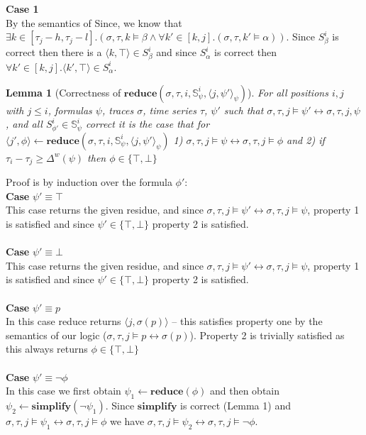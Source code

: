 \documentclass[10pt,a4paper]{article}
\newcommand{\rp}[2]{\ensuremath{\langle #1, #2 \rangle}}
\newcommand{\rpt}[3]{\ensuremath{\langle #1, #2 \rangle}_{#3}}
\newtheorem{lemma}{Lemma}
\begin{document}
\noindent \textbf{Case 1} \\

By the semantics of Since, we know that $\exists k \in [\tau_j-h,\tau_j-l].(\sigma, \tau, k \vDash \beta \wedge \forall k' \in [k,j].(\sigma, \tau, k' \vDash \alpha))$. Since $S^i_{\beta}$ is correct then there is a $\rp{k}{\top} \in S^i_{\beta}$ and since $S^i_\alpha$ is correct then $\forall k' \in [k,j]. \rp{k'}{\top} \in S^i_\alpha$.

\begin{lemma}[Correctness of $\mathbf{reduce}(\sigma, \tau, i, \mathbb{S}^i_{\psi}, \rpt{j}{\psi'}{\psi})$]
For all positions $i,j$ with $j \leq i$, formulas $\psi$, traces $\sigma$, time series $\tau$, $\psi'$ such that 
$\sigma, \tau, j \vDash \psi' \leftrightarrow \sigma, \tau, j, \psi$, and all $S^i_{\phi'} \in \mathbb{S}^i_{\psi}$ correct it is the case that
for $\rp{j'}{\phi} \leftarrow \mathbf{reduce}(\sigma, \tau, i, \mathbb{S}^i_{\psi}, \rpt{j}{\psi'}{\psi})$ 
1) $\sigma, \tau, j \vDash \psi \leftrightarrow \sigma, \tau, j \vDash \phi$ and
2) if $\tau_i - \tau_j \geq \Delta^w(\psi)$ then $\phi \in \{\top, \bot\}$
\end{lemma}

\noindent Proof is by induction over the formula $\phi'$: \\
\noindent \textbf{Case} $\psi' \equiv \top$ \\
This case returns the given residue, and since $\sigma, \tau, j \vDash \psi' \leftrightarrow \sigma, \tau, j \vDash \psi$, 
property 1 is satisfied and since $\psi' \in \{\top,\bot\}$ property 2 is satisfied.
\\ \\ %
\noindent \textbf{Case} $\psi' \equiv \bot$ \\
This case returns the given residue, and since $\sigma, \tau, j \vDash \psi' \leftrightarrow \sigma, \tau, j \vDash \psi$, 
property 1 is satisfied and since $\psi' \in \{\top,\bot\}$ property 2 is satisfied.
\\ \\ %
\noindent \textbf{Case} $\psi' \equiv p$ \\
In this case reduce returns $\rp{j}{\sigma(p)}$ -- this satisfies property one by the semantics of our logic ($\sigma, \tau, j \vDash p \leftrightarrow \sigma(p)$).
Property 2 is trivially satisfied as this always returns $\phi \in \{\top, \bot\}$
\\ \\ %
\noindent \textbf{Case} $\psi' \equiv \neg \phi$ \\
In this case we first obtain $\psi_1 \leftarrow \mathbf{reduce}(\phi)$ and then obtain $\psi_2 \leftarrow \mathbf{simplify}(\neg \psi_1)$.
Since $\mathbf{simplify}$ is correct (Lemma 1) and $\sigma, \tau, j \vDash \psi_1 \leftrightarrow \sigma, \tau, j \vDash \phi$ 
	we have $\sigma, \tau, j \vDash \psi_2 \leftrightarrow \sigma, \tau, j \vDash \neg \phi$.
\end{document}
